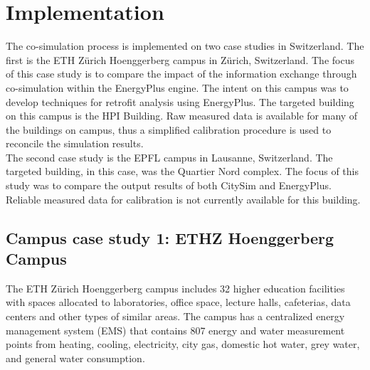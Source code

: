 \documentclass{tBPS2e}
\theoremstyle{plain}
\theoremstyle{definition}
\theoremstyle{remark}
\newcommand{\noteDT}[1]{\footnote{\textcolor{green}{#1}}}
\begin{document}

 
\section{Implementation}\label{Implementation and results}
The co-simulation process is implemented on two case studies in Switzerland.
The first is the ETH Z\"urich Hoenggerberg campus in Z\"urich, Switzerland.
The focus of this case study is to compare the impact of the information
exchange through co-simulation within the EnergyPlus engine. The intent on
this campus was to develop techniques for retrofit analysis using EnergyPlus.
The targeted building on this campus is the HPI Building. Raw measured data is
available for many of the buildings on campus, thus a simplified calibration
procedure is used to reconcile the simulation results.\\

The second case study is the EPFL campus in Lausanne, Switzerland. The
targeted building, in this case, was the Quartier Nord complex. The focus of
this study was to compare the output results of both CitySim and EnergyPlus.
Reliable measured data for calibration is not currently available for this
building.

\subsection{Campus case study 1: ETHZ Hoenggerberg Campus}
The ETH Z\"urich Hoenggerberg campus includes 32 higher education facilities
 with spaces allocated to laboratories, office space, lecture halls,
 cafeterias, data centers and other types of similar areas. The campus has a
 centralized energy management system (EMS) that contains 807 energy and water
 measurement points from heating, cooling, electricity, city gas, domestic hot
 water, grey water, and general water consumption. %
\end{document}
